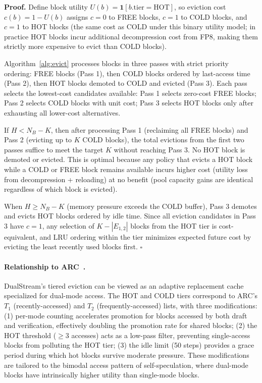 \documentclass[review]{elsarticle}
\theoremstyle{definition}
\theoremstyle{remark}
\renewenvironment{proof}{\noindent\textbf{Proof.}}{\hfill$\square$\par}
\begin{document}
\begin{proof}
Define block utility $U(b) = \mathbf{1}[b.\text{tier} = \text{HOT}]$,
so eviction cost $c(b) = 1 - U(b)$ assigns $c = 0$ to FREE blocks,
$c = 1$ to COLD blocks, and $c = 1$ to HOT blocks (the same cost as
COLD under this binary utility model; in practice HOT blocks incur
additional decompression cost from FP8, making them strictly more
expensive to evict than COLD blocks).

Algorithm~\ref{alg:evict} processes blocks in three passes with
strict priority ordering: FREE blocks (Pass 1), then COLD blocks
ordered by last-access time (Pass 2), then HOT blocks demoted to
COLD and evicted (Pass 3). Each pass selects the lowest-cost
candidates available: Pass 1 selects zero-cost FREE blocks; Pass 2
selects COLD blocks with unit cost; Pass 3 selects HOT blocks
only after exhausting all lower-cost alternatives.

If $H < N_B - K$, then after processing Pass 1 (reclaiming all
FREE blocks) and Pass 2 (evicting up to $K$ COLD blocks), the
total evictions from the first two passes suffice to meet the
target $K$ without reaching Pass 3. No HOT block is demoted or
evicted. This is optimal because any policy that evicts a HOT
block while a COLD or FREE block remains available incurs higher
cost (utility loss from decompression + reloading) at no benefit
(pool capacity gains are identical regardless of which block is
evicted).

When $H \ge N_B - K$ (memory pressure exceeds the COLD buffer),
Pass 3 demotes and evicts HOT blocks ordered by idle time. Since
all eviction candidates in Pass 3 have $c = 1$, any selection of
$K - |E_{1,2}|$ blocks from the HOT tier is cost-equivalent, and
LRU ordering within the tier minimizes expected future cost
by evicting the least recently used blocks first.
\end{proof}

\paragraph{Relationship to ARC~\cite{arc2003}.}
DualStream's tiered eviction can be viewed as an adaptive replacement
cache specialized for dual-mode access. The HOT and COLD tiers correspond
to ARC's $T_1$ (recently-accessed) and $T_2$ (frequently-accessed)
lists, with three modifications: (1) per-mode counting accelerates
promotion for blocks accessed by both draft and verification, effectively
doubling the promotion rate for shared blocks; (2) the HOT threshold
($\ge 3$ accesses) acts as a low-pass filter, preventing single-access
blocks from polluting the HOT tier; (3) the idle limit (50 steps) provides
a grace period during which hot blocks survive moderate pressure. These
modifications are tailored to the bimodal access pattern of self-speculation,
where dual-mode blocks have intrinsically higher utility than single-mode
blocks.
\end{document}

